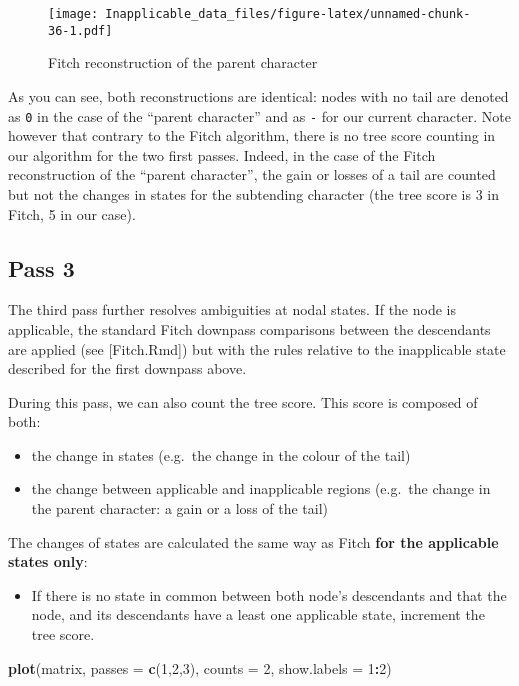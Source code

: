 \documentclass[]{book}
\newenvironment{Shaded}{\begin{snugshade}}{\end{snugshade}}
\newcommand{\KeywordTok}[1]{\textcolor[rgb]{0.13,0.29,0.53}{\textbf{#1}}}
\newcommand{\DataTypeTok}[1]{\textcolor[rgb]{0.13,0.29,0.53}{#1}}
\newcommand{\DecValTok}[1]{\textcolor[rgb]{0.00,0.00,0.81}{#1}}
\newcommand{\OperatorTok}[1]{\textcolor[rgb]{0.81,0.36,0.00}{\textbf{#1}}}
\newcommand{\NormalTok}[1]{#1}
\providecommand{\tightlist}{%
  \setlength{\itemsep}{0pt}\setlength{\parskip}{0pt}}
\theoremstyle{definition}
\theoremstyle{definition}
\theoremstyle{definition}
\theoremstyle{remark}
\begin{document}
\begin{figure}
\centering
\texttt{[image: Inapplicable\_data\_files/figure-latex/unnamed-chunk-36-1.pdf]}
\caption{\label{fig:unnamed-chunk-36}Fitch reconstruction of the parent
character}
\end{figure}

As you can see, both reconstructions are identical: nodes with no tail
are denoted as \texttt{0} in the case of the ``parent character'' and as
\texttt{-} for our current character. Note however that contrary to the
Fitch algorithm, there is no tree score counting in our algorithm for
the two first passes. Indeed, in the case of the Fitch reconstruction of
the ``parent character'', the gain or losses of a tail are counted but
not the changes in states for the subtending character (the tree score
is 3 in Fitch, 5 in our case).

\hypertarget{pass-3}{%
\subsection{Pass 3}\label{pass-3}}

The third pass further resolves ambiguities at nodal states. If the node
is applicable, the standard Fitch downpass comparisons between the
descendants are applied (see {[}Fitch.Rmd{]}) but with the rules
relative to the inapplicable state described for the first downpass
above.

During this pass, we can also count the tree score. This score is
composed of both:

\begin{itemize}
\tightlist
\item
  the change in states (e.g.~the change in the colour of the tail)
\item
  the change between applicable and inapplicable regions (e.g.~the
  change in the parent character: a gain or a loss of the tail)
\end{itemize}

The changes of states are calculated the same way as Fitch \textbf{for
the applicable states only}:

\begin{itemize}
\tightlist
\item
  If there is no state in common between both node's descendants and
  that the node, and its descendants have a least one applicable state,
  increment the tree score.
\end{itemize}

\begin{Shaded}
\begin{Highlighting}[]
\KeywordTok{plot}\NormalTok{(matrix, }\DataTypeTok{passes =} \KeywordTok{c}\NormalTok{(}\DecValTok{1}\NormalTok{,}\DecValTok{2}\NormalTok{,}\DecValTok{3}\NormalTok{), }\DataTypeTok{counts =} \DecValTok{2}\NormalTok{, }\DataTypeTok{show.labels =} \DecValTok{1}\OperatorTok{:}\DecValTok{2}\NormalTok{)}
\end{Highlighting}
\end{Shaded}
\end{document}

